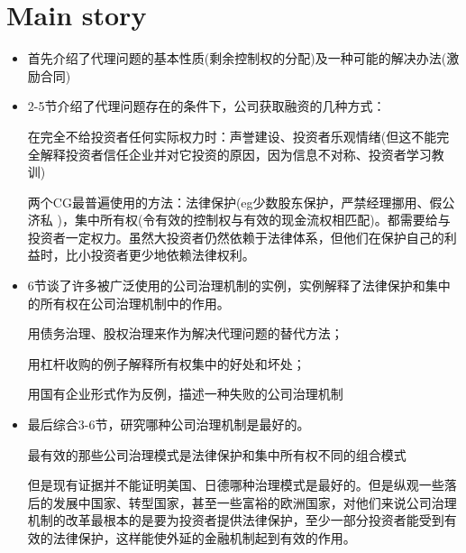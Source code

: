 \documentclass[a4paper]{article}
\begin{document}
\section{Main story}	
	\begin{itemize}
		\item 首先介绍了代理问题的基本性质(剩余控制权的分配)及一种可能的解决办法(激励合同)
		\item 2-5节介绍了代理问题存在的条件下，公司获取融资的几种方式：\par
		在完全不给投资者任何实际权力时：声誉建设、投资者乐观情绪(但这不能完全解释投资者信任企业并对它投资的原因，因为信息不对称、投资者学习教训)\par
		两个CG最普遍使用的方法：法律保护(eg少数股东保护，严禁经理挪用、假公济私
		)，集中所有权(令有效的控制权与有效的现金流权相匹配)。都需要给与投资者一定权力。虽然大投资者仍然依赖于法律体系，但他们在保护自己的利益时，比小投资者更少地依赖法律权利。
		\item 6节谈了许多被广泛使用的公司治理机制的实例，实例解释了法律保护和集中的所有权在公司治理机制中的作用。\par 
		用债务治理、股权治理来作为解决代理问题的替代方法；\par
		用杠杆收购的例子解释所有权集中的好处和坏处；\par
		用国有企业形式作为反例，描述一种失败的公司治理机制
		\item 最后综合3-6节，研究哪种公司治理机制是最好的。\par 
		最有效的那些公司治理模式是法律保护和集中所有权不同的组合模式\par
		但是现有证据并不能证明美国、日德哪种治理模式是最好的。但是纵观一些落后的发展中国家、转型国家，甚至一些富裕的欧洲国家，对他们来说公司治理机制的改革最根本的是要为投资者提供法律保护，至少一部分投资者能受到有效的法律保护，这样能使外延的金融机制起到有效的作用。
	\end{itemize}
	
	

	
\end{document}
